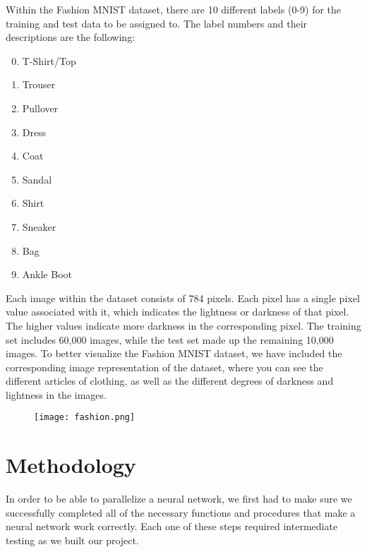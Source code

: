\documentclass[twoside,twocolumn]{article}
\begin{document}
Within the Fashion MNIST dataset, there are 10 different labels (0-9) for the training and test data to be assigned to. The label numbers and their descriptions are the following:
\begin{multicols}{2}
\begin{enumerate}
    \setcounter{enumi}{-1}
    \item[0:] T-Shirt/Top
    \item[1:] Trouser
    \item[2:] Pullover
    \item[3:] Dress
    \item[4:] Coat
    \item[5:] Sandal
    \item[6:] Shirt
    \item[7:] Sneaker
    \item[8:] Bag
    \item[9:] Ankle Boot
\end{enumerate}
\end{multicols}
Each image within the dataset consists of 784 pixels. Each pixel has a single pixel value associated with it, which indicates the lightness or darkness of that pixel. The higher values indicate more darkness in the corresponding pixel. The training set includes 60,000 images, while the test set made up the remaining 10,000 images. To better visualize the Fashion MNIST dataset, we have included the corresponding image representation of the dataset, where you can see the different articles of clothing, as well as the different degrees of darkness and lightness in the images.\\
\begin{figure}[h]
    \centering
    \texttt{[image: fashion.png]}
\end{figure}


\section{Methodology}

In order to be able to parallelize a neural network, we first had to make sure we successfully completed all of the necessary functions and procedures that make a neural network work correctly. Each one of these steps required intermediate testing as we built our project.\\
\end{document}
